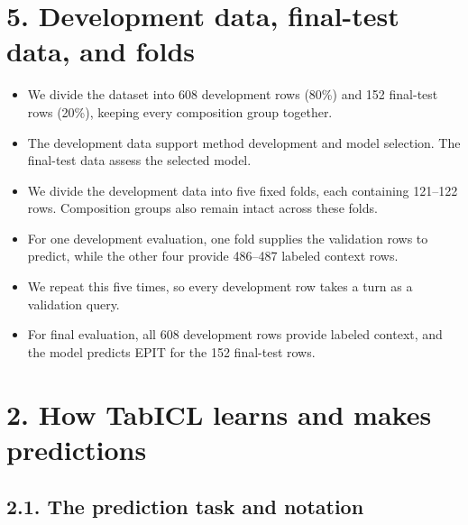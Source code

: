 \documentclass[11pt]{article}
\newenvironment{notes}
  {\begin{itemize}\setlength{\itemsep}{0.45em}\setlength{\parsep}{0pt}}
  {\end{itemize}}
\begin{document}
\section*{5. Development data, final-test data, and folds}

\begin{notes}

    \item We divide the dataset into 608 development rows (80\%) and 152 final-test rows
    (20\%), keeping every composition group together.

    \item The development data support method development and model selection. The
    final-test data assess the selected model.

    \item We divide the development data into five fixed folds, each containing 121–122
    rows. Composition groups also remain intact across these folds.

    \item For one development evaluation, one fold supplies the validation rows to predict,
    while the other four provide 486–487 labeled context rows.

    \item We repeat this five times, so every development row takes a turn as a validation
    query.

    \item For final evaluation, all 608 development rows provide labeled context, and the
    model predicts EPIT for the 152 final-test rows.

\end{notes}

\section*{2. How TabICL learns and makes predictions}

\subsection*{2.1. The prediction task and notation}
\end{document}
